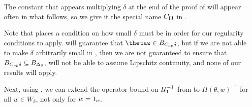 %
The constant that appears multiplying $\delta$ at the end of the proof of
 will appear often in what follows, so we give it
the special name $C_{\textrm{IJ}}$ in .

%
Note that  places a condition on how
small $\delta$ must be in order for our regularity conditions to
apply.  will guarantee that $\thetaw\in\thetadeltaball$,
but if we are not able to make $\delta$ arbitrarily small in ,
then we are not guaranteed to ensure that $B_{C_{op}\delta}\subseteq B_{\Delta_{\theta}}$,
will not be able to assume Lipschitz continuity, and none of our results
will apply.

Next, using , we can extend the operator
bound on $H_{1}^{-1}$ from  to $H\left(\theta,w\right)^{-1}$
for all $w\in W_{\delta}$, not only for $w=1_{w}$.

